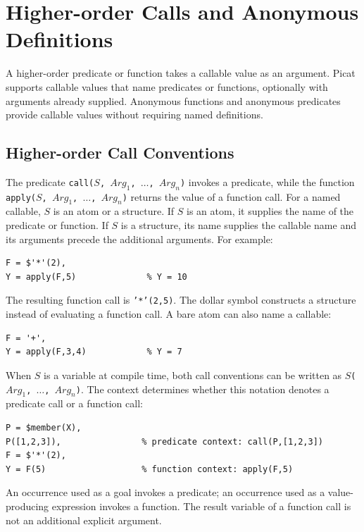 \chapter{Higher-order Calls and Anonymous Definitions}
\label{chapter:higher-order}

A higher-order predicate or function takes a callable value as an argument.
Picat supports callable values that name predicates or functions, optionally
with arguments already supplied. Anonymous functions and anonymous predicates
provide callable values without requiring named definitions.

\section{Higher-order Call Conventions}
\label{section:higher-order-conventions}

The predicate \texttt{call($S$, $Arg_1$, $\ldots$, $Arg_n$)} invokes a
predicate, while the function \texttt{apply($S$, $Arg_1$, $\ldots$, $Arg_n$)}
returns the value of a function call. For a named callable, $S$ is an atom or
a structure. If $S$ is an atom, it supplies the name of the predicate or
function. If $S$ is a structure, its name supplies the callable name and its
arguments precede the additional arguments. For example:
\begin{verbatim}
F = $'*'(2),
Y = apply(F,5)              % Y = 10
\end{verbatim}
The resulting function call is \texttt{'*'(2,5)}. The dollar symbol constructs
a structure instead of evaluating a function call. A bare atom can also name
a callable:
\begin{verbatim}
F = '+',
Y = apply(F,3,4)            % Y = 7
\end{verbatim}

When $S$ is a variable at compile time, both call conventions can be written
as \texttt{$S$($Arg_1$, $\ldots$, $Arg_n$)}. The context determines whether
this notation denotes a predicate call or a function call:
\begin{verbatim}
P = $member(X),
P([1,2,3]),                % predicate context: call(P,[1,2,3])
F = $'*'(2),
Y = F(5)                   % function context: apply(F,5)
\end{verbatim}
An occurrence used as a goal invokes a predicate; an occurrence used as a
value-producing expression invokes a function. The result variable of a
function call is not an additional explicit argument.

